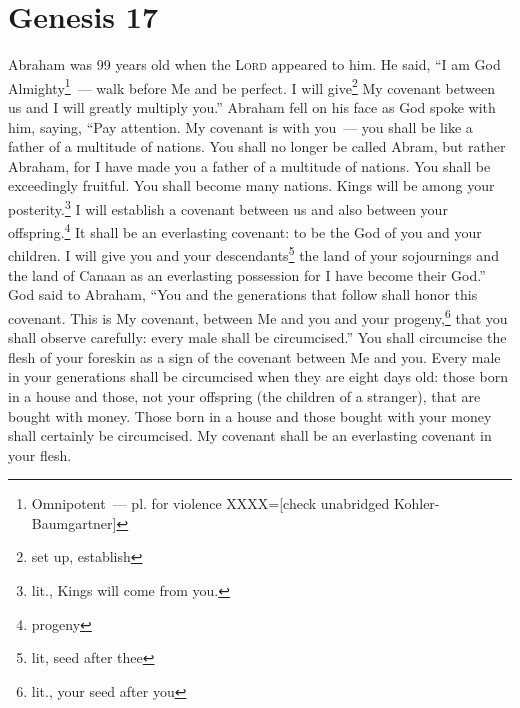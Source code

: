 \section{Genesis 17}\label{Genesis 17}
\begin{enumerate}[align=center]
     Abraham was 99 years old when the \textsc{Lord} appeared to him. He said, ``I am God Almighty\footnote{Omnipotent~--- pl. for violence XXXX=[check unabridged Kohler-Baumgartner]}~--- walk before Me and be perfect.%
     I will give\footnote{set up, establish} My covenant between us and I will greatly multiply you.''%
     Abraham fell on his face as God spoke with him, saying,%
     ``Pay attention. My covenant is with you~--- you shall be like a father of a multitude of nations.%
     You shall no longer be called Abram, but rather Abraham, for I have made you a father of a multitude of nations.%
     You shall be exceedingly fruitful. You shall become many nations. Kings will be among your posterity.\footnote{lit., Kings will come from you.}%
     I will establish a covenant between us and also between your offspring.\footnote{progeny} It shall be an everlasting covenant: to be the God of you and your children.%
     I will give you and your descendants\footnote{lit, seed after thee} the land of your sojournings and the land of Canaan as an everlasting possession for I have become their God.''%
     God said to Abraham, ``You and the generations that follow shall honor this covenant.%
     This is My covenant, between Me and you and your progeny,\footnote{lit., your seed after you} that you shall observe carefully: every male shall be circumcised.''%
     You shall circumcise the flesh of your foreskin as a sign of the covenant between Me and you.%
     Every male in your generations shall be circumcised when they are eight days old: those born in a house and those, not your offspring (the children of a stranger), that are bought with money.%
     Those born in a house and those bought with your money shall certainly be circumcised. My covenant shall be an everlasting covenant in your flesh.%

\end{enumerate}
